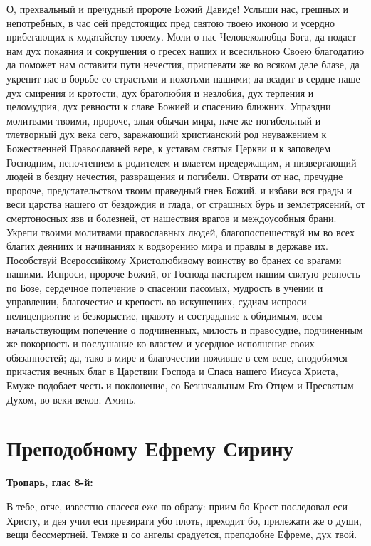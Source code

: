 О, прехвальный и пречудный пророче Божий Давиде! Услыши нас, грешных и непотребных, в час сей предстоящих пред святою твоею иконою и усердно прибегающих к ходатайству твоему. Моли о нас Человеколюбца Бога, да подаст нам дух покаяния и сокрушения о гресех наших и всесильною Своею благодатию да поможет нам оставити пути нечестия, приспевати же во всяком деле блазе, да укрепит нас в борьбе со страстьми и похотьми нашими; да всадит в сердце наше дух смирения и кротости, дух братолюбия и незлобия, дух терпения и целомудрия, дух ревности к славе Божией и спасению ближних. Упраздни молитвами твоими, пророче, злыя обычаи мира, паче же погибельный и тлетворный дух века сего, заражающий христианский род неуважением к Божественней Православней вере, к уставам святыя Церкви и к заповедем Господним, непочтением к родителем и влаcтем предержащим, и низвергающий людей в бездну нечестия, развращения и погибели. Отврати от нас, пречудне пророче, предстательством твоим праведный гнев Божий, и избави вся грады и веси царства нашего от бездождия и глада, от страшных бурь и землетрясений, от смертоносных язв и болезней, от нашествия врагов и междоусобныя брани. Укрепи твоими молитвами православных людей, благопоспешествуй им во всех благих деяниих и начинаниях к водворению мира и правды в державе их. Пособствуй Всероссийкому Христолюбивому воинству во бранех со врагами нашими. Испроси, пророче Божий, от Господа пастырем нашим святую ревность по Бозе, сердечное попечение о спасении пасомых, мудрость в учении и управлении, благочестие и крепость во искушениих, судиям испроси нелицеприятие и безкорыстие, правоту и сострадание к обидимым, всем начальствующим попечение о подчиненных, милость и правосудие, подчиненным же покорность и послушание ко властем и усердное исполнение своих обязанностей; да, тако в мире и благочестии поживше в сем веце, сподобимся причастия вечных благ в Царствии Господа и Спаса нашего Иисуса Христа, Емуже подобает честь и поклонение, со Безначальным Его Отцем и Пресвятым Духом, во веки веков. Аминь.


\section{Преподобному Ефрему Сирину}
 


\bfseries Тропарь, глас 8-й:\normalfont{}


В тебе, отче, известно спасеся еже по образу: приим бо Крест последовал еси Христу, и дея учил еси презирати убо плоть, преходит бо, прилежати же о души, вещи бессмертней. Темже и со ангелы срадуется, преподобне Ефреме, дух твой.


